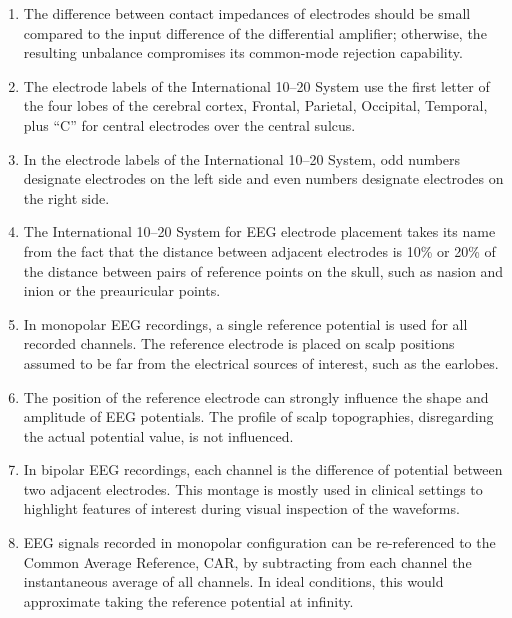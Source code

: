 \begin{enumerate}[label=\arabic*.]
    \item The difference between contact impedances of electrodes should be small compared to the input difference of the differential amplifier; otherwise, the resulting unbalance compromises its common-mode rejection capability.
    
    \item The electrode labels of the International 10--20 System use the first letter of the four lobes of the cerebral cortex, Frontal, Parietal, Occipital, Temporal, plus ``C'' for central electrodes over the central sulcus.
    
    \item In the electrode labels of the International 10--20 System, odd numbers designate electrodes on the left side and even numbers designate electrodes on the right side.
    
    \item The International 10--20 System for EEG electrode placement takes its name from the fact that the distance between adjacent electrodes is 10\% or 20\% of the distance between pairs of reference points on the skull, such as nasion and inion or the preauricular points.
    
    \item In monopolar EEG recordings, a single reference potential is used for all recorded channels. The reference electrode is placed on scalp positions assumed to be far from the electrical sources of interest, such as the earlobes.
    
    \item The position of the reference electrode can strongly influence the shape and amplitude of EEG potentials. The profile of scalp topographies, disregarding the actual potential value, is not influenced.
    
    \item In bipolar EEG recordings, each channel is the difference of potential between two adjacent electrodes. This montage is mostly used in clinical settings to highlight features of interest during visual inspection of the waveforms.
    
    \item EEG signals recorded in monopolar configuration can be re-referenced to the Common Average Reference, CAR, by subtracting from each channel the instantaneous average of all channels. In ideal conditions, this would approximate taking the reference potential at infinity.
\end{enumerate}

